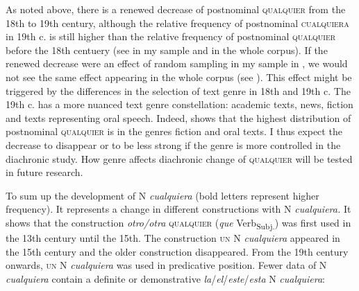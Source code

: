 As noted above, there is a renewed decrease of postnominal \textsc{qualquier} from the 18th to 19th century, although the relative frequency of postnominal \textsc{cualquiera} in 19th c. is still higher than the relative frequency of postnominal \textsc{qualquier} before the 18th centuery (see  in my sample and  in the whole corpus). If the renewed decrease were an effect of random sampling in my sample in  , we would not see the same effect appearing in the whole corpus (see ). This effect might be triggered by the differences in the selection of text genre in 18th and 19th c. The 19th c. has a more nuanced text genre constellation: academic texts, news, fiction and texts representing oral speech. Indeed,  shows that the highest distribution of postnominal \textsc{qualquier} is in the genres fiction and oral texts. I thus expect the decrease to disappear or to be less strong if the genre is more controlled in the diachronic study. How genre affects diachronic change of \textsc{qualquier} will be tested in future research.

To sum up the development of N \textit{cualquiera} (bold letters represent higher frequency). It represents a change in different constructions with N \textit{cualquiera.} It shows that the construction \textit{otro/otra} \textsc{qualquier} (\textit{que} Verb\textsubscript{Subj.}) was first used in the 13th century until the 15th. The construction \textsc{un} N \textit{cualquiera} appeared in the 15th century and the older construction disappeared. From the 19th century onwards, \textsc{un} N \textit{cualquiera} was used in predicative position. Fewer data of N \textit{cualquiera} contain a definite or demonstrative \textit{la}/\textit{el}/\textit{este}/\textit{esta} N \textit{cualquiera}:





